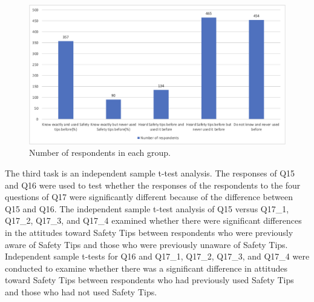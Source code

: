 \begin{figure}[h]
  \includegraphics[width=\linewidth]{Figure/Figure6.jpg}
  \centering
  \caption{Number of respondents in each group. }
  \label{fig6}
\end{figure}

The third task is an independent sample t-test analysis. The responses of Q15 and Q16 were used to test whether the responses of the respondents to the four questions of Q17 were significantly different because of the difference between Q15 and Q16. The independent sample t-test analysis of Q15 versus Q17\_1, Q17\_2, Q17\_3, and Q17\_4 examined whether there were significant differences in the attitudes toward Safety Tips between respondents who were previously aware of Safety Tips and those who were previously unaware of Safety Tips. Independent sample t-tests for Q16 and Q17\_1, Q17\_2, Q17\_3, and Q17\_4 were conducted to examine whether there was a significant difference in attitudes toward Safety Tips between respondents who had previously used Safety Tips and those who had not used Safety Tips.

